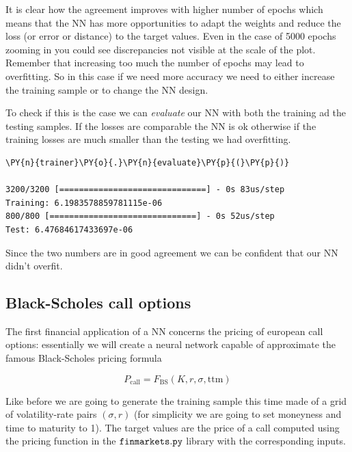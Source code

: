 It is clear how the agreement improves with higher number of epochs
which means that the NN has more opportunities to adapt the weights and
reduce the loss (or error or distance) to the target values. Even in the
case of 5000 epochs zooming in you could see discrepancies not visible
at the scale of the plot. Remember that increasing too much the number
of epochs may lead to overfitting. So in this case if we need more
accuracy we need to either increase the training sample or to change the
NN design.

To check if this is the case we can \emph{evaluate} our NN with both the
training ad the testing samples. If the losses are comparable the NN is
ok otherwise if the training losses are much smaller than the testing we
had overfitting.

\begin{tcolorbox}[breakable, size=fbox, boxrule=1pt, pad at break*=1mm,colback=cellbackground, colframe=cellborder]
\begin{Verbatim}[commandchars=\\\{\}]
\PY{n}{trainer}\PY{o}{.}\PY{n}{evaluate}\PY{p}{(}\PY{p}{)}

3200/3200 [==============================] - 0s 83us/step
Training: 6.1983578859781115e-06
800/800 [==============================] - 0s 52us/step
Test: 6.47684617433697e-06
\end{Verbatim}
\end{tcolorbox}

Since the two numbers are in good agreement we can be confident that our
NN didn't overfit.

\subsection{Black-Scholes call
options}\label{black-scholes-call-options}

The first financial application of a NN concerns the pricing of european
call options: essentially we will create a neural network capable of
approximate the famous Black-Scholes pricing formula

\begin{equation} P_\textrm{call} = F_\textrm{BS}(K, r, \sigma, \mathrm{ttm})\end{equation}

Like before we are going to generate the training sample this time made
of a grid of volatility-rate pairs \((\sigma, r)\) (for simplicity we
are going to set moneyness and time to maturity to 1). The target values
are the price of a call computed using the pricing function in the
\(\tt{finmarkets.py}\) library with the corresponding inputs.

